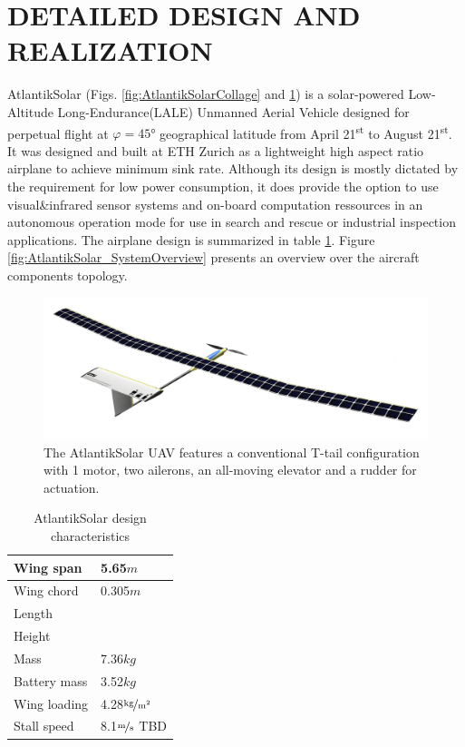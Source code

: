 \section{DETAILED DESIGN AND REALIZATION}

AtlantikSolar (Figs. \ref{fig:AtlantikSolarCollage} and \ref{fig:CAD_AtlantikSolarFull}) is a solar-powered Low-Altitude Long-Endurance(LALE) Unmanned Aerial Vehicle designed for perpetual flight at $\varphi=45°$ geographical latitude from April 21\textsuperscript{st} to August 21\textsuperscript{st}. It was designed and built at ETH Zurich as a lightweight high aspect ratio airplane to achieve minimum sink rate. Although its design is mostly dictated by the requirement for low power consumption, it does provide the option to use visual\&infrared sensor systems and on-board computation ressources in an autonomous operation mode for use in search and rescue or industrial inspection applications. The airplane design is summarized in table \ref{tab:DetailedDesignParameters}. Figure \ref{fig:AtlantikSolar_SystemOverview} presents an overview over the aircraft components topology.

\begin{figure}[tb]
    \centering
    \includegraphics[width=\linewidth]{images/6_CAD_AtlantikSolarFull}
    \caption{The AtlantikSolar UAV features a conventional T-tail configuration with 1 motor, two ailerons, an all-moving elevator and a rudder for actuation.}
    \label{fig:CAD_AtlantikSolarFull}
\end{figure}

\begin{table}
\caption{AtlantikSolar design characteristics}
\label{tab:DetailedDesignParameters}
\begin{center}
\begin{tabular}{l l}
Wing span & 5.65$\unit{m}$\\
\hline Wing chord& 0.305$\unit{m}$\\
\hline Length& \\
\hline Height&\\
\hline Mass& 7.36$\unit{kg}$\\
\hline Battery mass& 3.52$\unit{kg}$\\
\hline Wing loading&4.28$\unitfrac{kg}{m^2}$\\
\hline Stall speed& 8.1$\unitfrac{m}{s}$ TBD\\
\end{tabular}
\end{center}
\end{table}

